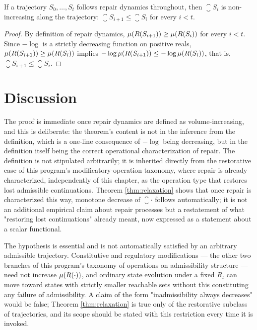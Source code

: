 \begin{theorem}
\label{thm:relaxation}
If a trajectory $S_0, \dots, S_t$ follows repair dynamics throughout,
then $\closure{S_i}$ is non-increasing along the trajectory:
$\closure{S_{i+1}} \le \closure{S_i}$ for every $i < t$.
\end{theorem}

\begin{proof}
By definition of repair dynamics, $\mu(R(S_{i+1})) \ge
\mu(R(S_i))$ for every $i < t$. Since $-\log$ is a strictly
decreasing function on positive reals, $\mu(R(S_{i+1})) \ge
\mu(R(S_i))$ implies $-\log \mu(R(S_{i+1})) \le -\log
\mu(R(S_i))$, that is, $\closure{S_{i+1}} \le \closure{S_i}$.
\end{proof}

\section{Discussion}

The proof is immediate once repair dynamics are defined as
volume-increasing, and this is deliberate: the theorem's content is not
in the inference from the definition, which is a one-line consequence of
$-\log$ being decreasing, but in the definition itself being the correct
operational characterization of repair. The definition is not
stipulated arbitrarily; it is inherited directly from the restorative
case of this program's modificatory-operation taxonomy, where repair is
already characterized, independently of this chapter, as the operation
type that restores lost admissible continuations. Theorem
\ref{thm:relaxation} shows that once repair is characterized this way,
monotone decrease of $\closure{\cdot}$ follows automatically; it is not
an additional empirical claim about repair processes but a restatement
of what "restoring lost continuations" already meant, now expressed as
a statement about a scalar functional.

\begin{remark}
The hypothesis is essential and is not automatically satisfied by an
arbitrary admissible trajectory. Constitutive and regulatory
modifications --- the other two branches of this program's taxonomy of
operations on admissibility structure --- need not increase
$\mu(R(\cdot))$, and ordinary state evolution under a fixed $R_t$
can move toward states with strictly smaller reachable sets without
this constituting any failure of admissibility. A claim of the form
"inadmissibility always decreases" would be false; Theorem
\ref{thm:relaxation} is true only of the restorative subclass of
trajectories, and its scope should be stated with this restriction every
time it is invoked.
\end{remark}

